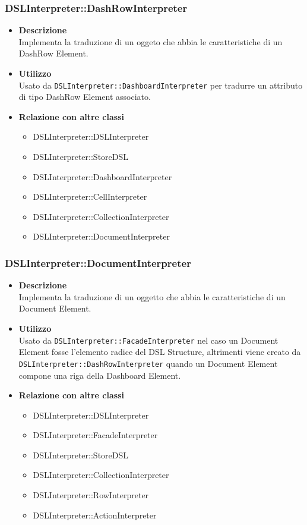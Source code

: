\subsubsection{DSLInterpreter::DashRowInterpreter}
\begin{itemize}
\item \textbf{Descrizione} \hfill \\
Implementa la traduzione di un oggeto che abbia le caratteristiche di un DashRow Element.
\item \textbf{Utilizzo} \hfill \\
Usato da \texttt{DSLInterpreter::DashboardInterpreter} per tradurre un attributo di tipo DashRow Element associato.
\item \textbf{Relazione con altre classi}
\begin{itemize}
\item DSLInterpreter::DSLInterpreter
\item DSLInterpreter::StoreDSL
\item DSLInterpreter::DashboardInterpreter
\item DSLInterpreter::CellInterpreter
\item DSLInterpreter::CollectionInterpreter
\item DSLInterpreter::DocumentInterpreter
\end{itemize}
\end{itemize}

\subsubsection{DSLInterpreter::DocumentInterpreter}
\begin{itemize}
\item \textbf{Descrizione} \hfill \\
  Implementa la traduzione di un oggetto che abbia le caratteristiche di un Document Element.
\item \textbf{Utilizzo} \hfill \\
Usato da \texttt{DSLInterpreter::FacadeInterpreter} nel caso un Document Element fosse l'elemento radice del DSL Structure, altrimenti viene creato da \\\texttt{DSLInterpreter::DashRowInterpreter} quando un Document Element compone una riga della Dashboard Element.
\item \textbf{Relazione con altre classi}
  \begin{itemize}
  \item DSLInterpreter::DSLInterpreter
  \item DSLInterpreter::FacadeInterpreter
  \item DSLInterpreter::StoreDSL
  \item DSLInterpreter::CollectionInterpreter
  \item DSLInterpreter::RowInterpreter
  \item DSLInterpreter::ActionInterpreter
  \end{itemize}
\end{itemize}


